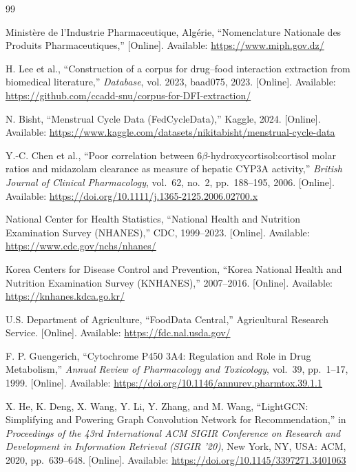 \begin{thebibliography}{99}

Ministère de l'Industrie Pharmaceutique, Algérie,
``Nomenclature Nationale des Produits Pharmaceutiques,''
[Online]. Available: \url{https://www.miph.gov.dz/}

H. Lee et al.,
``Construction of a corpus for drug–food interaction extraction from biomedical literature,''
\textit{Database}, vol. 2023, baad075, 2023.
[Online]. Available: \url{https://github.com/ccadd-snu/corpus-for-DFI-extraction/}

N. Bisht,
``Menstrual Cycle Data (FedCycleData),''
Kaggle, 2024.
[Online]. Available: \url{https://www.kaggle.com/datasets/nikitabisht/menstrual-cycle-data}

Y.-C. Chen et al.,
``Poor correlation between 6$\beta$-hydroxycortisol:cortisol molar ratios and midazolam clearance as measure of hepatic CYP3A activity,''
\textit{British Journal of Clinical Pharmacology}, vol.~62, no.~2, pp.~188--195, 2006.
[Online]. Available: \url{https://doi.org/10.1111/j.1365-2125.2006.02700.x}

National Center for Health Statistics,
``National Health and Nutrition Examination Survey (NHANES),''
CDC, 1999--2023.
[Online]. Available: \url{https://www.cdc.gov/nchs/nhanes/}

Korea Centers for Disease Control and Prevention,
``Korea National Health and Nutrition Examination Survey (KNHANES),''
2007--2016.
[Online]. Available: \url{https://knhanes.kdca.go.kr/}

U.S. Department of Agriculture,
``FoodData Central,''
Agricultural Research Service.
[Online]. Available: \url{https://fdc.nal.usda.gov/}

F. P. Guengerich,
``Cytochrome P450 3A4: Regulation and Role in Drug Metabolism,''
\textit{Annual Review of Pharmacology and Toxicology}, vol.~39, pp.~1--17, 1999.
[Online]. Available: \url{https://doi.org/10.1146/annurev.pharmtox.39.1.1}

X. He, K. Deng, X. Wang, Y. Li, Y. Zhang, and M. Wang,
``LightGCN: Simplifying and Powering Graph Convolution Network for Recommendation,''
in \textit{Proceedings of the 43rd International ACM SIGIR Conference on Research and Development in Information Retrieval (SIGIR '20)},
New York, NY, USA: ACM, 2020, pp.~639--648.
[Online]. Available: \url{https://doi.org/10.1145/3397271.3401063}


\end{thebibliography}
